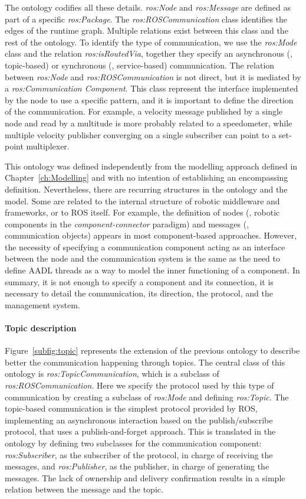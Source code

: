 The ontology codifies all these details. \textit{ros:Node} and \textit{ros:Message} are defined as part of a specific \textit{ros:Package}. The \textit{ros:ROS\-Com\-mu\-ni\-ca\-tion} class identifies the edges of the runtime graph. Multiple relations exist between this class and the rest of the ontology. To identify the type of communication, we use the \textit{ros:Mode} class and the relation \textit{ros:isRoutedVia}, together they specify an asynchronous (\ie, topic-based) or synchronous (\ie, service-based) communication. The relation between \textit{ros:Node} and \textit{ros:ROS\-Com\-mu\-ni\-ca\-tion} is not direct, but it is mediated by a \textit{ros:Communication Component}. This class represent the interface implemented by the node to use a specific pattern, and it is important to define the direction of the communication. For example, a velocity message published by a single node and read by a multitude is more probably related to a speedometer, while multiple velocity publisher converging on a single subscriber can point to a set-point multiplexer.

This ontology was defined independently from the modelling approach defined in Chapter~\ref{ch:Modelling} and with no intention of establishing an encompassing definition. Nevertheless, there are recurring structures in the ontology and the model. Some are related to the internal structure of robotic middleware and frameworks, or to ROS itself. For example, the definition of nodes (\ie, robotic components in the \textit{component-connector} paradigm) and messages (\ie, communication objects) appears in most component-based approaches. However, the necessity of specifying a communication component acting as an interface between the node and the communication system is the same as the need to define AADL threads as a way to model the inner functioning of a component. In summary, it is not enough to specify a component and its connection, it is necessary to detail the communication, its direction, the protocol, and the management system.

\paragraph{Topic description} Figure~\ref{subfig:topic} represents the extension of the previous ontology to describe better the communication happening through topics. The central class of this ontology is \textit{ros:Topic\-Com\-mu\-ni\-ca\-tion}, which is a subclass of  \textit{ros:ROS\-Com\-mu\-ni\-ca\-tion}. Here we specify the protocol used by this type of communication by creating a subclass of \textit{ros:Mode} and defining \textit{ros:Topic}. The topic-based communication is the simplest protocol provided by ROS, implementing an asynchronous interaction based on the publish/subscribe protocol, that uses a publish-and-forget approach. This is translated in the ontology by defining two subclasses for the communication component: \textit{ros:Subscriber}, as the subscriber of the protocol, in charge of receiving the messages, and \textit{ros:Publisher}, as the publisher, in charge of generating the messages. The lack of ownership and delivery confirmation results in a simple relation between the message and the topic.

